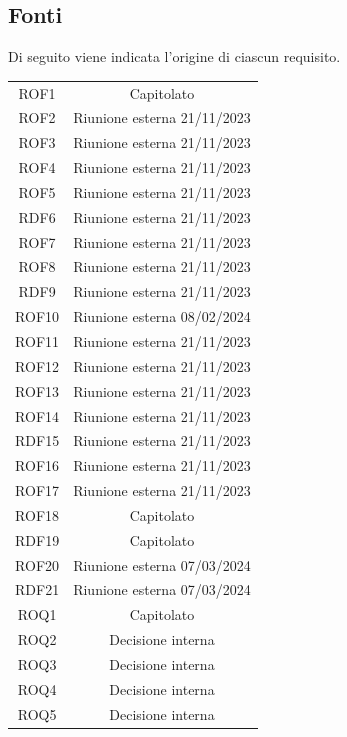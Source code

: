 \documentclass{article}
\newcommand{\custombold}{\contour{black}}
\begin{document}
\subsection{Fonti}
Di seguito viene indicata l'origine di ciascun requisito.\\
\begin{center}
\begin{tabular}{c|c}
\hline
\rowcolor{Blue}
\custombold{ID}&\custombold{Fonte}\\
\hline
\rowcolor{LighterBlue}
ROF1 & Capitolato\\
\hline
\rowcolor{LightBlue}
ROF2 & Riunione esterna 21/11/2023\\
\hline
\rowcolor{LighterBlue}
ROF3 & Riunione esterna 21/11/2023\\
\hline
\rowcolor{LightBlue}
ROF4 & Riunione esterna 21/11/2023\\
\hline
\rowcolor{LighterBlue}
ROF5 & Riunione esterna 21/11/2023\\
\hline
\rowcolor{LightBlue}
RDF6 & Riunione esterna 21/11/2023\\
\hline
\rowcolor{LighterBlue}
ROF7 & Riunione esterna 21/11/2023\\
\hline
\rowcolor{LightBlue}
ROF8 & Riunione esterna 21/11/2023\\
\hline
\rowcolor{LighterBlue}
RDF9 & Riunione esterna 21/11/2023\\
\hline
\rowcolor{LightBlue}
ROF10 & Riunione esterna 08/02/2024\\
\hline
\rowcolor{LighterBlue}
ROF11 & Riunione esterna 21/11/2023\\
\hline
\rowcolor{LightBlue}
ROF12 & Riunione esterna 21/11/2023\\
\hline
\rowcolor{LighterBlue}
ROF13 & Riunione esterna 21/11/2023\\
\hline
\rowcolor{LightBlue}
ROF14 & Riunione esterna 21/11/2023\\
\hline
\rowcolor{LighterBlue}
RDF15 & Riunione esterna 21/11/2023\\
\hline
\rowcolor{LightBlue}
ROF16 & Riunione esterna 21/11/2023\\
\hline
\rowcolor{LighterBlue}
ROF17 & Riunione esterna 21/11/2023\\
\hline
\rowcolor{LightBlue}
ROF18 & Capitolato\\
\hline
\rowcolor{LighterBlue}
RDF19 & Capitolato\\
\hline
\rowcolor{LightBlue}
ROF20 & Riunione esterna 07/03/2024\\
\hline
\rowcolor{LighterBlue}
RDF21 & Riunione esterna 07/03/2024\\
\hline
\rowcolor{LightBlue}
ROQ1 & Capitolato\\
\hline
\rowcolor{LighterBlue}
ROQ2 & Decisione interna\\
\hline
\rowcolor{LightBlue}
ROQ3 & Decisione interna\\
\hline
\rowcolor{LighterBlue}
ROQ4 & Decisione interna\\
\hline
\rowcolor{LightBlue}
ROQ5 & Decisione interna\\
\hline
\end{tabular}
\end{center}
\end{document}

